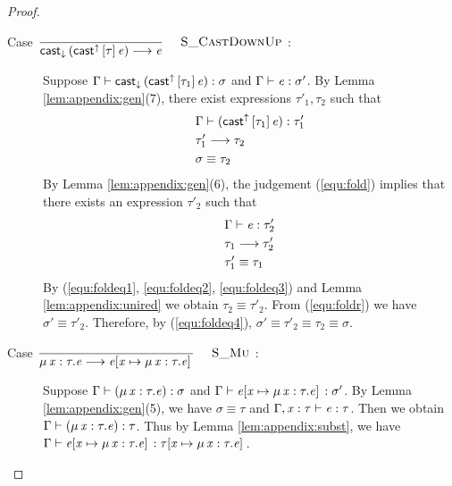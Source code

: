 \begin{proof}
\begin{description}
        \item[Case ${\displaystyle\frac{\begin{array}{l} \end{array}}{ \mathsf{cast}_{\downarrow} \, ( \mathsf{cast}^{\uparrow} \, [ \tau ] \, \mathit{e} ) \longrightarrow \mathit{e}}\quad\textsc{ {\textsc{S\_CastDownUp}}{} }}$:] $\quad$ \\
        Suppose $\Gamma  \vdash  \mathsf{cast}_{\downarrow} \, (  \mathsf{cast}^{\uparrow} \, [  \tau_{{\mathrm{1}}}  ] \,  \mathit{e}  )  :  \sigma$ and $\Gamma  \vdash  \mathit{e}  :  \sigma'$. By
Lemma \ref{lem:appendix:gen}(7), there exist expressions $\tau'_{{\mathrm{1}}}, \tau_{{\mathrm{2}}}$ such
that 
        \begin{align}
            &\Gamma  \vdash  (  \mathsf{cast}^{\uparrow} \, [  \tau_{{\mathrm{1}}}  ] \,  \mathit{e}  )  :  \tau'_{{\mathrm{1}}} \label{equ:fold} \\
            &\tau'_{{\mathrm{1}}}  \longrightarrow  \tau_{{\mathrm{2}}} \label{equ:foldeq1} \\
            &\sigma  \equiv  \tau_{{\mathrm{2}}} \label{equ:foldeq4}
        \end{align}
        By Lemma \ref{lem:appendix:gen}(6), the judgement (\ref{equ:fold})
implies that there exists an expression $\tau'_{{\mathrm{2}}}$ such that
        \begin{align}
            &\Gamma  \vdash  \mathit{e}  :  \tau'_{{\mathrm{2}}} \label{equ:foldr} \\
            &\tau_{{\mathrm{1}}}  \longrightarrow  \tau'_{{\mathrm{2}}} \label{equ:foldeq2} \\
            &\tau'_{{\mathrm{1}}}  \equiv  \tau_{{\mathrm{1}}} \label{equ:foldeq3}
        \end{align}
        By (\ref{equ:foldeq1}, \ref{equ:foldeq2}, \ref{equ:foldeq3}) and Lemma
\ref{lem:appendix:unired} we obtain $\tau_{{\mathrm{2}}}  \equiv  \tau'_{{\mathrm{2}}}$. From (\ref{equ:foldr}) we
have $\sigma'  \equiv  \tau'_{{\mathrm{2}}}$. Therefore, by (\ref{equ:foldeq4}), $\sigma'  \equiv  \tau'_{{\mathrm{2}}}
 \equiv  \tau_{{\mathrm{2}}}  \equiv  \sigma$.
        
        \item[Case ${\displaystyle\frac{\begin{array}{l} \end{array}}{ \mu \, \mathit{x} : \tau . \mathit{e} \longrightarrow \mathit{e} [ \mathit{x} \mapsto \mu \, \mathit{x} : \tau . \mathit{e} ] \,}\quad\textsc{ {\textsc{S\_Mu}}{} }}$:] $\quad$ \\
        Suppose $\Gamma  \vdash  (  \mu \, \mathit{x}  :  \tau  .  \mathit{e}  )  :  \sigma$ and $\Gamma  \vdash  \mathit{e}  [  \mathit{x}  \mapsto  \mu \, \mathit{x}  :  \tau  .  \mathit{e}  ] \,  :  \sigma'$.
By Lemma \ref{lem:appendix:gen}(5), we have $\sigma  \equiv  \tau$ and $\Gamma  ,  \mathit{x}  :  \tau  \vdash  \mathit{e}  :  \tau$. Then we obtain $\Gamma  \vdash  (  \mu \, \mathit{x}  :  \tau  .  \mathit{e}  )  :  \tau$. Thus by Lemma
\ref{lem:appendix:subst}, we have $\Gamma  \vdash  \mathit{e}  [  \mathit{x}  \mapsto  \mu \, \mathit{x}  :  \tau  .  \mathit{e}  ] \,  :  \tau  [  \mathit{x}  \mapsto  \mu \, \mathit{x}  :  \tau  .  \mathit{e}  ] \,$.
        

\end{description}
\end{proof}
